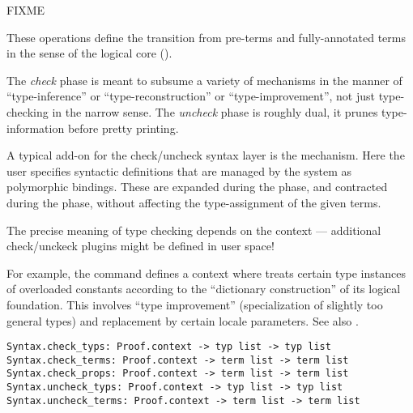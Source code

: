 \begin{isabellebody}
\begin{isamarkuptext}
  \begin{description}

  \item FIXME

  \end{description}%
\end{isamarkuptext}%
\isamarkuptrue%
%
\endisatagmlref
{\isafoldmlref}%
%
\isadelimmlref
%
\endisadelimmlref
%
\isamarkuptrue%
%
\begin{isamarkuptext}%
These operations define the transition from pre-terms and
  fully-annotated terms in the sense of the logical core
  ().

  The \emph{check} phase is meant to subsume a variety of mechanisms
  in the manner of ``type-inference'' or ``type-reconstruction'' or
  ``type-improvement'', not just type-checking in the narrow sense.
  The \emph{uncheck} phase is roughly dual, it prunes type-information
  before pretty printing.

  A typical add-on for the check/uncheck syntax layer is the \hyperlink{command.abbreviation}{\mbox{}} mechanism.  Here the user specifies syntactic
  definitions that are managed by the system as polymorphic  bindings.  These are expanded during the 
  phase, and contracted during the  phase, without
  affecting the type-assignment of the given terms.

  \medskip The precise meaning of type checking depends on the context
  --- additional check/unckeck plugins might be defined in user space!

  For example, the \hyperlink{command.class}{\mbox{}} command defines a context where
   treats certain type instances of overloaded
  constants according to the ``dictionary construction'' of its
  logical foundation.  This involves ``type improvement''
  (specialization of slightly too general types) and replacement by
  certain locale parameters.  See also \cite{Haftmann-Wenzel:2009}.%
\end{isamarkuptext}%
\isamarkuptrue%
%
\isadelimmlref
%
\endisadelimmlref
%
\isatagmlref
%
\begin{isamarkuptext}%
\begin{mldecls}
  \verb|Syntax.check_typs: Proof.context -> typ list -> typ list| \\
  \verb|Syntax.check_terms: Proof.context -> term list -> term list| \\
  \verb|Syntax.check_props: Proof.context -> term list -> term list| \\
  \verb|Syntax.uncheck_typs: Proof.context -> typ list -> typ list| \\
  \verb|Syntax.uncheck_terms: Proof.context -> term list -> term list| \\
  \end{mldecls}


\end{isamarkuptext}
\end{isabellebody}

